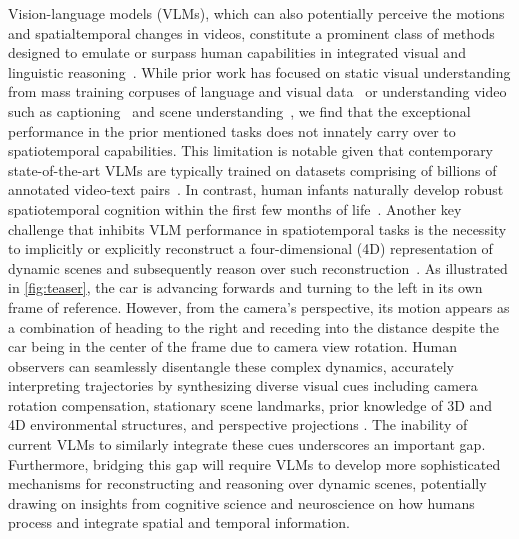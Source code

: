 Vision-language models (VLMs), which can also potentially perceive the motions and spatialtemporal changes in videos, constitute a prominent class of methods designed to emulate or surpass human capabilities in integrated visual and linguistic reasoning~\cite{LeCun1989Backpropagation, Dosovitskiy2021An}. While prior work has focused on static visual understanding from mass training corpuses of language and visual data~\cite{Radford2021Learning} or understanding video such as captioning~\cite{Lu2019ViLBERTPT} and scene understanding~\cite{Chen_2022_CVPR}, we find that the exceptional performance in the prior mentioned tasks does not innately carry over to spatiotemporal capabilities. This limitation is notable given that contemporary state-of-the-art VLMs are typically trained on datasets comprising of billions of annotated video-text pairs~\cite{liu2023world}. In contrast, human infants naturally develop robust spatiotemporal cognition within the first few months of life~\cite{Spelke2007Core}. Another key challenge that inhibits VLM performance in spatiotemporal tasks is the necessity to implicitly or explicitly reconstruct a four-dimensional (4D) representation of dynamic scenes and subsequently reason over such reconstruction~\cite{wang2024compositional}. As illustrated in \cref{fig:teaser}, the car is advancing forwards and turning to the left in its own frame of reference. However, from the camera's perspective, its motion appears as a combination of heading to the right and receding into the distance despite the car being in the center of the frame due to camera view rotation. Human observers can seamlessly disentangle these complex dynamics, accurately interpreting trajectories by synthesizing diverse visual cues including camera rotation compensation, stationary scene landmarks, prior knowledge of 3D and 4D environmental structures, and perspective projections \cite{Marr1981Directional,Burgess2006Spatial,Leslie1984Spatiotemporal,Freyd1984Representational}. The inability of current VLMs to similarly integrate these cues underscores an important gap. Furthermore, bridging this gap will require VLMs to develop more sophisticated mechanisms for reconstructing and reasoning over dynamic scenes, potentially drawing on  insights from cognitive science and neuroscience on how humans process and integrate spatial and temporal information.
